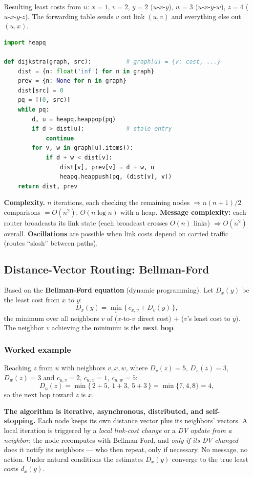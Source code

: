 \documentclass[hidelinks]{article}
\begin{document}
\medskip
\noindent Resulting least costs from $u$: $x{=}1$, $v{=}2$, $y{=}2$
($u$-$x$-$y$), $w{=}3$ ($u$-$x$-$y$-$w$), $z{=}4$ ($u$-$x$-$y$-$z$). The
forwarding table sends $v$ out link $(u,v)$ and everything else out $(u,x)$.

\begin{lstlisting}[language=Python, caption={Dijkstra's least-cost paths}]
import heapq

def dijkstra(graph, src):          # graph[u] = {v: cost, ...}
    dist = {n: float('inf') for n in graph}
    prev = {n: None for n in graph}
    dist[src] = 0
    pq = [(0, src)]
    while pq:
        d, u = heapq.heappop(pq)
        if d > dist[u]:            # stale entry
            continue
        for v, w in graph[u].items():
            if d + w < dist[v]:
                dist[v], prev[v] = d + w, u
                heapq.heappush(pq, (dist[v], v))
    return dist, prev
\end{lstlisting}

\noindent \textbf{Complexity.} $n$ iterations, each checking the remaining
nodes $\Rightarrow n(n{+}1)/2$ comparisons $= O(n^2)$; $O(n\log n)$ with a
heap. \textbf{Message complexity:} each router broadcasts its link state
(each broadcast crosses $O(n)$ links) $\Rightarrow O(n^2)$ overall.
\textbf{Oscillations} are possible when link costs depend on carried traffic
(routes ``slosh'' between paths).

\subsection{Distance-Vector Routing: Bellman-Ford}

Based on the \textbf{Bellman-Ford equation} (dynamic programming). Let $D_x(y)$
be the least cost from $x$ to $y$:
\[
    D_x(y) = \min_{v}\big\{\, c_{x,v} + D_v(y) \,\big\},
\]
the minimum over all neighbors $v$ of ($x$-to-$v$ direct cost) $+$
($v$'s least cost to $y$). The neighbor $v$ achieving the minimum is the
\textbf{next hop}.

\subsubsection{Worked example}
Reaching $z$ from $u$ with neighbors $v,x,w$, where $D_v(z){=}5$, $D_x(z){=}3$,
$D_w(z){=}3$ and $c_{u,v}{=}2$, $c_{u,x}{=}1$, $c_{u,w}{=}5$:
\[
    D_u(z) = \min\{\,2{+}5,\ 1{+}3,\ 5{+}3\,\} = \min\{7,4,8\} = 4,
\]
so the next hop toward $z$ is $x$.

\textbf{The algorithm is iterative, asynchronous, distributed, and
self-stopping.} Each node keeps its own distance vector plus its neighbors'
vectors. A local iteration is triggered by a \emph{local link-cost change} or a
\emph{DV update from a neighbor}; the node recomputes with Bellman-Ford, and
\emph{only if its DV changed} does it notify its neighbors --- who then repeat,
only if necessary. No message, no action. Under natural conditions the
estimates $D_x(y)$ converge to the true least costs $d_x(y)$.
\end{document}
